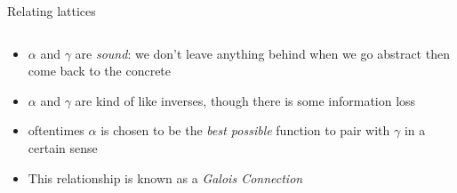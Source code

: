 \documentclass[aspectratio=169]{beamer}
\begin{document}
\begin{frame}{Relating lattices}
\begin{columns}[T]
\end{columns}\vspace{-1em}
\begin{itemize}
    \item<5-> $\alpha$ and $\gamma$ are \emph{sound}: we don't leave anything behind when we go abstract then come back to the concrete
    \item<6-> $\alpha$ and $\gamma$ are kind of like inverses, though
      there is some information loss
    \item<7-> oftentimes $\alpha$ is chosen to be the \emph{best possible} function to pair
      with $\gamma$ in a certain sense
    \item<8-> This relationship is known as a \alert{\emph{Galois Connection}}
\end{itemize}
\end{frame}
\endgroup
\end{document}
